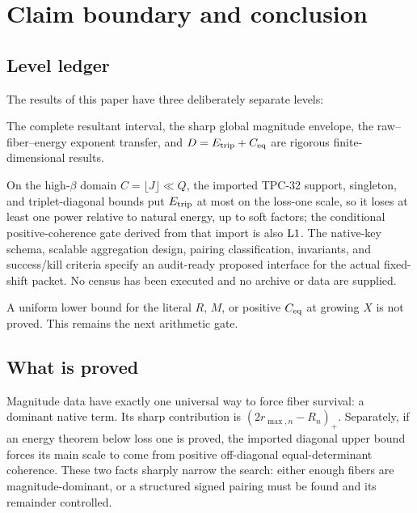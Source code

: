 \section{Claim boundary and conclusion}
\label{sec:claim-boundary}

\subsection{Level ledger}

The results of this paper have three deliberately separate levels:
\begin{description}[leftmargin=2.4em,style=nextline]
 \item[\(\Lzero\): exact algebra and finite geometry.]
 The complete resultant interval, the sharp global magnitude
 envelope, the raw--fiber--energy exponent transfer, and
 \(D=E_{\mathrm{trip}}+C_{\mathrm{eq}}\) are rigorous finite-dimensional results.

 \item[\(\Lone\): typed physical interface.]
 On the high-\(\beta\) domain \(C=\lfloor J\rfloor\ll Q\), the
 imported TPC-32 support, singleton, and triplet-diagonal bounds put
 \(E_{\mathrm{trip}}\) at most on the loss-one scale, so it loses at least one
 power relative to natural energy, up to soft factors; the conditional
 positive-coherence gate derived from that import is also \(\Lone\).
 The native-key schema, scalable aggregation design, pairing
 classification, invariants, and success/kill criteria specify an
 audit-ready proposed interface for the actual fixed-shift packet.
 No census has been executed and no archive or data are supplied.

 \item[\(\Ltwo\): growing arithmetic theorem.]
 A uniform lower bound for the literal \(R\), \(M\), or positive
 \(C_{\mathrm{eq}}\) at growing \(X\) is not proved.  This remains the next
 arithmetic gate.
\end{description}

\subsection{What is proved}

Magnitude data have exactly one universal way to force fiber
survival: a dominant native term.  Its sharp contribution is
\((2r_{\max,n}-R_n)_+\).  Separately, if an energy theorem below loss
one is proved, the imported diagonal upper bound forces its main scale
to come from positive off-diagonal equal-determinant coherence.  These
two facts sharply narrow the search: either enough fibers are
magnitude-dominant, or a structured signed pairing must be found and
its remainder controlled.

